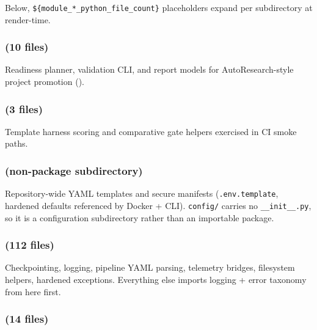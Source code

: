 \documentclass[
  english,
]{article}
\begin{document}
Below, \texttt{\$\{module\_*\_python\_file\_count\}} placeholders expand
per subdirectory at render-time.

\subsubsection{\texorpdfstring{ (10
files)}{infrastructure.autoresearch (10 files)}}\label{infrastructure.autoresearch-10-files}

Readiness planner, validation CLI, and report models for
AutoResearch-style project promotion
().

\subsubsection{\texorpdfstring{ (3
files)}{infrastructure.benchmark (3 files)}}\label{infrastructure.benchmark-3-files}

Template harness scoring and comparative gate helpers exercised in CI
smoke paths.

\subsubsection{\texorpdfstring{
(non-package
subdirectory)}{infrastructure/config (non-package subdirectory)}}\label{infrastructureconfig-non-package-subdirectory}

Repository-wide YAML templates and secure manifests
(\texttt{.env.template}, hardened defaults referenced by Docker + CLI).
\texttt{config/} carries no \texttt{\_\_init\_\_.py}, so it is a
configuration subdirectory rather than an importable package.

\subsubsection{\texorpdfstring{ (112
files)}{infrastructure.core (112 files)}}\label{infrastructure.core-112-files}

Checkpointing, logging, pipeline YAML parsing, telemetry bridges,
filesystem helpers, hardened exceptions. Everything else imports logging
+ error taxonomy from here first.

\subsubsection{\texorpdfstring{ (14
files)}{infrastructure.doctor (14 files)}}\label{infrastructure.doctor-14-files}
\end{document}

